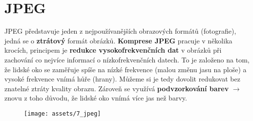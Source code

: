 \section{JPEG}
JPEG představuje jeden z nejpoužívanějších obrazových formátů (fotografie), jedná se o \textbf{ztrátový} formát obrázků. \textbf{Komprese JPEG} pracuje v několika krocích, principem je \textbf{redukce vysokofrekvenčních dat} v obrázků při zachování co nejvíce informací o nízkofrekvenčních datech. To je založeno na tom, že lidské oko se zaměřuje spíše na nízké frekvence (malou změnu jasu na ploše) a vysoké frekvence vnímá hůře (hrany). Můžeme si je tedy dovolit redukovat bez znatelné ztráty kvality obrazu. Zároveň se využívá \textbf{podvzorkování barev} $\rightarrow$ znovu z toho důvodu, že lidské oko vnímá více jas než barvy.

\begin{figure}[H]
    \centering
    \texttt{[image: assets/7\_jpeg]}
\end{figure}

